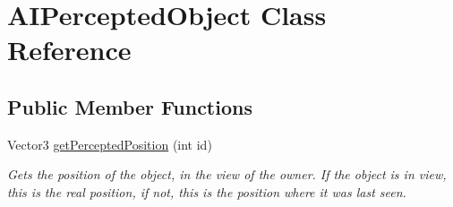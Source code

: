 \hypertarget{classAIPerceptedObject}{
\section{\-A\-I\-Percepted\-Object \-Class \-Reference}
\label{db/d6d/classAIPerceptedObject}
}
\subsection*{\-Public \-Member \-Functions}
\begin{DoxyCompactItemize}
\item 
\hypertarget{classAIPerceptedObject_ad4c6b8f2e409b15a4fd12f9c1176954a}{
\-Vector3 \hyperlink{classAIPerceptedObject_ad4c6b8f2e409b15a4fd12f9c1176954a}{get\-Percepted\-Position} (int id)}
\label{db/d6d/classAIPerceptedObject_ad4c6b8f2e409b15a4fd12f9c1176954a}

\begin{DoxyCompactList}\small\item\em \-Gets the position of the object, in the view of the owner. \-If the object is in view, this is the real position, if not, this is the position where it was last seen. \end{DoxyCompactList}\end{DoxyCompactItemize}
